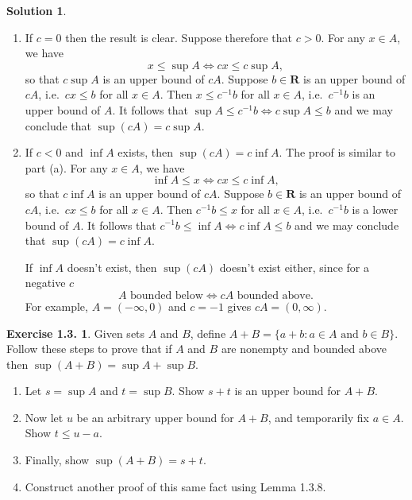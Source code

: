 \documentclass[12pt]{article}
\theoremstyle{definition}
\theoremstyle{exercise}
\newtheorem{exercise}{Exercise 1.3.}
\theoremstyle{solution}
\newtheorem*{solution}{Solution}
\newcommand{\R}{\mathbf{R}}
\begin{document}
\begin{solution}
    \begin{enumerate}
        \item If \( c = 0 \) then the result is clear. Suppose therefore that \( c > 0 \). For any \( x \in A \), we have
        \[
            x \leq \sup A \iff cx \leq c \sup A,
        \]
        so that \( c \sup A \) is an upper bound of \( cA \). Suppose \( b \in \R \) is an upper bound of \( cA \), i.e.\ \( cx \leq b \) for all \( x \in A \). Then \( x \leq c^{-1} b \) for all \( x \in A \), i.e.\ \( c^{-1} b \) is an upper bound of \( A \). It follows that \( \sup A \leq c^{-1} b \iff c \sup A \leq b \) and we may conclude that \( \sup (cA) = c \sup A \).

        \item If \( c < 0 \) and \( \inf A \) exists, then \( \sup (cA) = c \inf A \). The proof is similar to part (a). For any \( x \in A \), we have
        \[
            \inf A \leq x \iff cx \leq c \inf A,
        \]
        so that \( c \inf A \) is an upper bound of \( cA \). Suppose \( b \in \R \) is an upper bound of \( cA \), i.e.\ \( cx \leq b \) for all \( x \in A \). Then \( c^{-1} b \leq x \) for all \( x \in A \), i.e.\ \( c^{-1} b \) is a lower bound of \( A \). It follows that \( c^{-1} b \leq \inf A \iff c \inf A \leq b \) and we may conclude that \( \sup (cA) = c \inf A \).

        If \( \inf A \) doesn't exist, then \( \sup (cA) \) doesn't exist either, since for a negative \( c \)
        \[
            A \text{ bounded below} \iff cA \text{ bounded above}.
        \]
        For example, \( A = (-\infty, 0) \) and \( c = -1 \) gives \( cA = (0, \infty) \).
    \end{enumerate}
\end{solution}

\begin{exercise}
\label{ex:6}
    Given sets \( A \) and \( B \), define \( A + B = \{ a + b : a \in A \text{ and } b \in B \} \). Follow these steps to prove that if \( A \) and \( B \) are nonempty and bounded above then \( \sup (A + B) = \sup A + \sup B \).
    \begin{enumerate}
        \item Let \( s = \sup A \) and \( t = \sup B \). Show \( s + t \) is an upper bound for \( A + B \).

        \item Now let \( u \) be an arbitrary upper bound for \( A + B \), and temporarily fix \( a \in A \). Show \( t \leq u - a \).

        \item Finally, show \( \sup (A + B) = s + t \).

        \item Construct another proof of this same fact using Lemma 1.3.8.
    \end{enumerate}
\end{exercise}
\end{document}
